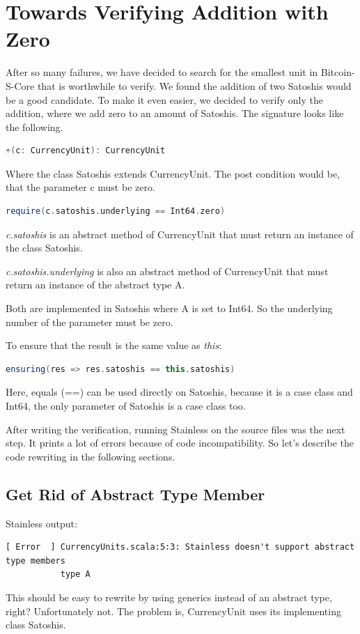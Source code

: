 \chapter{Towards Verifying Addition with Zero}
After so many failures, we have decided to search for the smallest unit in Bitcoin-S-Core that is worthwhile to verify.
We found the addition of two Satoshis would be a good candidate.
To make it even easier, we decided to verify only the addition, where we add zero to an amount of Satoshis.
The signature looks like the following.
\begin{lstlisting}[language=scala]
  +(c: CurrencyUnit): CurrencyUnit
\end{lstlisting}

Where the class Satoshis extends CurrencyUnit.
The post condition would be, that the parameter c must be zero.
\begin{lstlisting}[language=scala]
  require(c.satoshis.underlying == Int64.zero)
\end{lstlisting}

\emph{c.satoshis} is an abstract method of CurrencyUnit that must return an instance of the class Satoshis.

\emph{c.satoshis.underlying} is also an abstract method of CurrencyUnit that must return an instance of the abstract type A.

Both are implemented in Satoshis where A is set to Int64.
So the underlying number of the parameter must be zero.

To ensure that the result is the same value as \emph{this}:
\begin{lstlisting}[language=scala]
  ensuring(res => res.satoshis == this.satoshis)
\end{lstlisting}

Here, equals (==) can be used directly on Satoshis, because it is a case class and Int64, the only parameter of Satoshis is a case class too.

After writing the verification, running Stainless on the source files was the next step.
It prints a lot of errors because of code incompatibility.
So let's describe the code rewriting in the following sections.


\section{Get Rid of Abstract Type Member}
Stainless output:
{\footnotesize\begin{verbatim}
[ Error  ] CurrencyUnits.scala:5:3: Stainless doesn't support abstract type members
           type A
\end{verbatim}}
This should be easy to rewrite by using generics instead of an abstract type, right?
Unfortunately not.
The problem is, CurrencyUnit uses its implementing class Satoshis.

